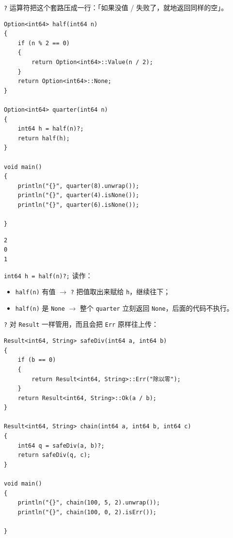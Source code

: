 \texttt{?} 运算符把这个套路压成一行：「如果没值 / 失败了，就地返回同样的空」。

\par
\medskip
\begin{lstlisting}[style=chali]
Option<int64> half(int64 n)
{
    if (n % 2 == 0)
    {
        return Option<int64>::Value(n / 2);
    }
    return Option<int64>::None;
}

Option<int64> quarter(int64 n)
{
    int64 h = half(n)?;
    return half(h);
}

void main()
{
    println("{}", quarter(8).unwrap());
    println("{}", quarter(4).isNone());
    println("{}", quarter(6).isNone());

}
\end{lstlisting}
\par
\medskip

\par
\medskip
\begin{lstlisting}[style=out]
2
0
1
\end{lstlisting}
\par
\medskip

\texttt{int64 h =\allowbreak{} half(\allowbreak{}n)\allowbreak{}?;} 读作：

\begin{itemize}

\item \texttt{half(\allowbreak{}n)\allowbreak{}} 有值 \ensuremath{\rightarrow} \texttt{?} 把值取出来赋给 \texttt{h}，继续往下；

\item \texttt{half(\allowbreak{}n)\allowbreak{}} 是 \texttt{None} \ensuremath{\rightarrow} 整个 \texttt{quarter} 立刻返回 \texttt{None}，后面的代码不执行。

\end{itemize}

\texttt{?} 对 \texttt{Result} 一样管用，而且会把 \texttt{Err} 原样往上传：

\par
\medskip
\begin{lstlisting}[style=chali]
Result<int64, String> safeDiv(int64 a, int64 b)
{
    if (b == 0)
    {
        return Result<int64, String>::Err("除以零");
    }
    return Result<int64, String>::Ok(a / b);
}

Result<int64, String> chain(int64 a, int64 b, int64 c)
{
    int64 q = safeDiv(a, b)?;
    return safeDiv(q, c);
}

void main()
{
    println("{}", chain(100, 5, 2).unwrap());
    println("{}", chain(100, 0, 2).isErr());

}
\end{lstlisting}
\par
\medskip

